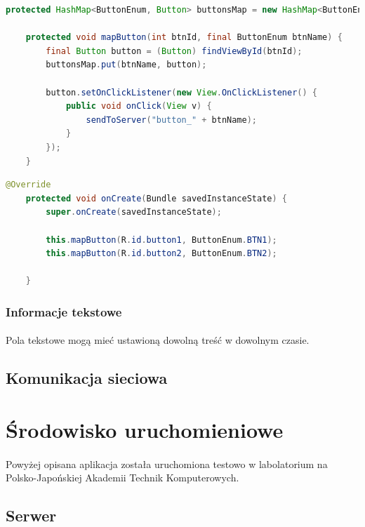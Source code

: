 \documentclass[12pt]{article}
\begin{document}
{\begin{lstlisting}[language=Java]
    protected HashMap<ButtonEnum, Button> buttonsMap = new HashMap<ButtonEnum, Button>();

    protected void mapButton(int btnId, final ButtonEnum btnName) {
        final Button button = (Button) findViewById(btnId);
        buttonsMap.put(btnName, button);

        button.setOnClickListener(new View.OnClickListener() {
            public void onClick(View v) {
                sendToServer("button_" + btnName);
            }
        });
    }
\end{lstlisting}


\begin{lstlisting}[language=Java]
 @Override
    protected void onCreate(Bundle savedInstanceState) {
        super.onCreate(savedInstanceState);

        this.mapButton(R.id.button1, ButtonEnum.BTN1);
        this.mapButton(R.id.button2, ButtonEnum.BTN2);

    }
\end{lstlisting}

\subsubsection{Informacje tekstowe}
\paragraph{}
Pola tekstowe mogą mieć ustawioną dowolną treść w dowolnym czasie.

\subsection{Komunikacja sieciowa}



\section{Środowisko uruchomieniowe}
\paragraph{}
Powyżej opisana aplikacja została uruchomiona testowo w labolatorium na Polsko-Japońskiej Akademii Technik Komputerowych.

\subsection{Serwer}
}
\end{document}
